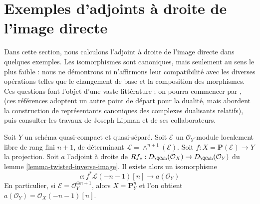 \section{Exemples d'adjoints à droite de l'image directe}
\label{section-examples}

\noindent
Dans cette section, nous calculons l'adjoint à droite de l'image directe dans quelques exemples. Les isomorphismes sont canoniques, mais seulement au sens le plus faible : nous ne démontrons ni n'affirmons leur compatibilité avec les diverses opérations telles que le changement de base et la composition des morphismes. Ces questions font l'objet d'une vaste littérature ; on pourra commencer par \cite{RD}, \cite{Conrad-GD} (ces références adoptent un autre point de départ pour la dualité, mais abordent la construction de représentants canoniques des complexes dualisants relatifs), puis consulter les travaux de Joseph Lipman et de ses collaborateurs.

\begin{lemma}
\label{lemma-upper-shriek-P1}
Soit $Y$ un schéma quasi-compact et quasi-séparé. Soit $\mathcal{E}$ un $\mathcal{O}_Y$-module localement libre de rang fini $n + 1$, de déterminant $\mathcal{L} = \wedge^{n + 1}(\mathcal{E})$. Soit $f : X = \mathbf{P}(\mathcal{E}) \to Y$ la projection. Soit $a$ l'adjoint à droite de $Rf_* : D_\QCoh(\mathcal{O}_X) \to D_\QCoh(\mathcal{O}_Y)$ du lemme \ref{lemma-twisted-inverse-image}. Il existe alors un isomorphisme
$$
c : f^*\mathcal{L}(-n - 1)[n] \longrightarrow a(\mathcal{O}_Y)
$$
En particulier, si $\mathcal{E} = \mathcal{O}_Y^{\oplus n + 1}$, alors $X = \mathbf{P}^n_Y$ et l'on obtient $a(\mathcal{O}_Y) = \mathcal{O}_X(-n - 1)[n]$.
\end{lemma}

